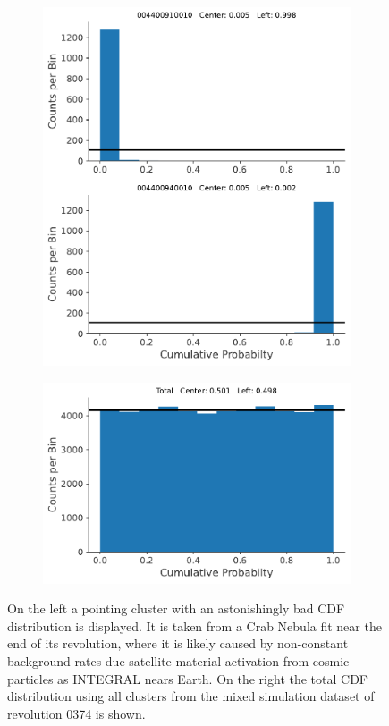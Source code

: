 \documentclass{report}
\begin{document}
\pagebreak

\begin{figure}[h]
  \centering
  \begin{subfigure}{0.5\textwidth}
    \centering
    \includegraphics[width=0.9\linewidth]{Images/PPC_and_Background_Analysis/004400910010_004400940010_cdf.pdf}
  \end{subfigure}%
  \begin{subfigure}{.5\textwidth}
    \centering
    \includegraphics[width=.9\linewidth]{Images/PPC_and_Background_Analysis/Total_cdf.pdf}
  \end{subfigure}
  \caption{On the left a pointing cluster with an astonishingly bad CDF distribution is displayed. It is taken from a Crab Nebula fit near the end of its revolution, where it is likely caused by non-constant background rates due satellite material activation from cosmic particles as INTEGRAL nears Earth. On the right the total CDF distribution using all clusters from the mixed simulation dataset of revolution 0374 is shown.}
  \label{fig ppc really bad total}
\end{figure}
\end{document}
